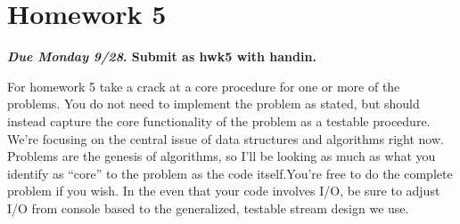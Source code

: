 \documentclass[10pt]{article}
\begin{document}
\section{Homework 5}

\begin{center}
\textbf{\textit{Due Monday 9/28}. Submit as hwk5 with handin.}
\end{center}

For homework 5 take a crack at a core procedure for one or more of the problems. You do not need to implement the problem as stated, but should instead capture the core functionality of the problem as a testable procedure. We're focusing on the central issue of data structures and algorithms right now.  Problems are the genesis of algorithms, so I'll be looking as much as what you identify as ``core'' to the problem as the code itself.You're free to do the complete problem if you wish. In the even that your code involves I/O, be sure to adjust I/O from console based to the generalized, testable stream design we use. 
\end{document}

